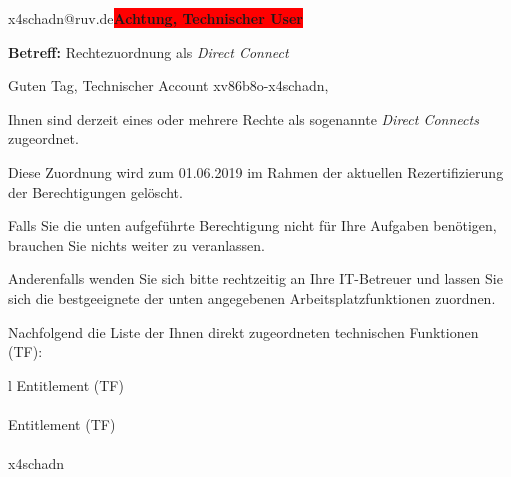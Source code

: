 \documentclass[a4paper,landscape,12pt]{letter}
\begin{document}
\begin{letter}{x4schadn@ruv.de\space\space\space\space\space\space\space\space\space\bfseries\colorbox{red}{Achtung, Technischer User}\hfill \break}
\begin{normalsize}
	\opening{\textbf{Betreff:} Rechtezuordnung als \emph{Direct Connect}}
	\begin{normalsize} \hfill
	\end{normalsize}

	\begin{normalsize}
		Guten Tag, 
	Technischer Account xv86b8o-x4schadn, \hfill \break
	\end{normalsize}
	\end{normalsize}
	
\begin{normalsize}
	Ihnen sind derzeit eines oder mehrere Rechte als sogenannte \emph{Direct Connects} zugeordnet.
	
	Diese Zuordnung wird zum 01.06.2019 im Rahmen der aktuellen Rezertifizierung der Berechtigungen gelöscht.
	
	Falls Sie die unten aufgeführte Berechtigung nicht für Ihre Aufgaben benötigen, 
	brauchen Sie nichts weiter zu veranlassen.
	
	Anderenfalls wenden Sie sich bitte rechtzeitig an Ihre IT-Betreuer 
	und lassen Sie sich die bestgeeignete der unten angegebenen Arbeitsplatzfunktionen zuordnen.
	\end{normalsize}
	
\begin{normalsize}
	Nachfolgend die Liste der Ihnen direkt zugeordneten technischen Funktionen (TF):

	\begin{longtable}{l}
		Entitlement (TF) \\ \hline
		\endfirsthead
		\\\hline
		Entitlement (TF) \\ \hline
		\endhead %
		\multicolumn{1}{r@{}}{Fortsetzung \ldots}\\
		\endfoot
		\hline
		\endlastfoot
	x4schadn\\
	\end{longtable}
	\end{normalsize}
	

\end{letter}
\end{document}
